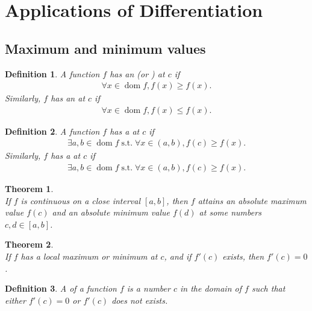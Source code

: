 \documentclass{article}
\DeclareMathOperator{\dom}{dom}
\DeclareMathOperator{\st}{s.t.}
\theoremstyle{sltheorem}
\newtheorem{definition}{Definition}[section]
\newtheorem{theorem}{Theorem}[section]
\begin{document}
\section{Applications of Differentiation}
\subsection{Maximum and minimum values}
\begin{definition}
    A function $f$ has an  (or ) at $c$ if
    \begin{align*}
        \forall x\in \dom f, f(x)\geq f(x).
    \end{align*} 
    Similarly, $f$ has an  at $c$ if
    \begin{align*}
        \forall x\in \dom f, f(x)\leq f(x).
    \end{align*}
\end{definition}
\begin{definition}
    A function $f$ has a  at $c$ if
    \begin{align*}
        \exists a,b\in \dom f \st \forall x\in (a,b), f(c)\geq f(x). 
    \end{align*}
    Similarly, $f$ has a  at $c$ if
    \begin{align*}
        \exists a,b\in \dom f\st \forall x\in(a,b), f(c)\geq f(x).
    \end{align*}
\end{definition}
\begin{theorem}
    \\
    If $f$ is continuous on a close interval $[a,b]$, then $f$ attains an absolute maximum value $f(c)$ and an absolute minimum value $f(d)$ at some numbers $c,d\in[a,b]$.
\end{theorem}
\begin{theorem}
    \\
    If $f$ has a local maximum or minimum at $c$, and if $f'(c)$ exists, then $f'(c)=0$.
\end{theorem}
\begin{definition}
    A  of a function $f$ is a number $c$ in the domain of $f$ such that either $f'(c)=0$ or $f'(c)$ does not exists.
\end{definition}
\end{document}
